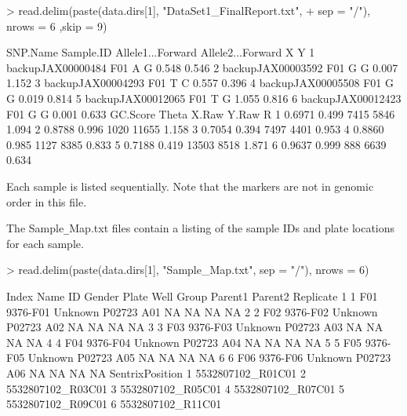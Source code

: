 \documentclass{article}
\begin{document}
\begin{Schunk}
\begin{Sinput}
> read.delim(paste(data.dirs[1], "DataSet1_FinalReport.txt", 
+            sep = "/"), nrows = 6 ,skip = 9)
\end{Sinput}
\begin{Soutput}
           SNP.Name Sample.ID Allele1...Forward Allele2...Forward     X     Y
1 backupJAX00000484       F01                 A                 G 0.548 0.546
2 backupJAX00003592       F01                 G                 G 0.007 1.152
3 backupJAX00004293       F01                 T                 C 0.557 0.396
4 backupJAX00005508       F01                 G                 G 0.019 0.814
5 backupJAX00012065       F01                 T                 G 1.055 0.816
6 backupJAX00012423       F01                 G                 G 0.001 0.633
  GC.Score Theta X.Raw Y.Raw     R
1   0.6971 0.499  7415  5846 1.094
2   0.8788 0.996  1020 11655 1.158
3   0.7054 0.394  7497  4401 0.953
4   0.8860 0.985  1127  8385 0.833
5   0.7188 0.419 13503  8518 1.871
6   0.9637 0.999   888  6639 0.634
\end{Soutput}
\end{Schunk}

Each sample is listed sequentially. Note that the markers are not in genomic order in this file.

\vspace{5 mm}

The Sample\verb|_|Map.txt files contain a listing of the sample IDs and plate locations for each sample.

\begin{Schunk}
\begin{Sinput}
> read.delim(paste(data.dirs[1], "Sample_Map.txt", sep = "/"), nrows = 6)
\end{Sinput}
\begin{Soutput}
  Index Name       ID  Gender  Plate Well Group Parent1 Parent2 Replicate
1     1  F01 9376-F01 Unknown P02723  A01    NA      NA      NA        NA
2     2  F02 9376-F02 Unknown P02723  A02    NA      NA      NA        NA
3     3  F03 9376-F03 Unknown P02723  A03    NA      NA      NA        NA
4     4  F04 9376-F04 Unknown P02723  A04    NA      NA      NA        NA
5     5  F05 9376-F05 Unknown P02723  A05    NA      NA      NA        NA
6     6  F06 9376-F06 Unknown P02723  A06    NA      NA      NA        NA
    SentrixPosition
1 5532807102_R01C01
2 5532807102_R03C01
3 5532807102_R05C01
4 5532807102_R07C01
5 5532807102_R09C01
6 5532807102_R11C01
\end{Soutput}
\end{Schunk}
\end{document}
